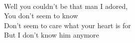 \\
Well you couldn't be that man I adored, \\
You don't seem to know \\
Don't seem to care what your heart is for \\
But I don't know him anymore \\
